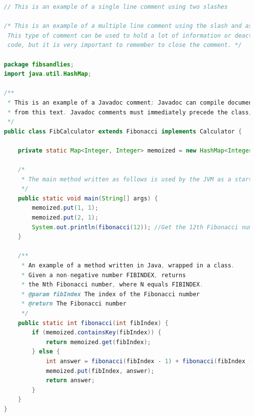 \begin{lstlisting}[language=Java, caption=\selectlanguage{greek}Παράδειγμα κώδικα σε \selectlanguage{english}Java]
// This is an example of a single line comment using two slashes

/* This is an example of a multiple line comment using the slash and asterisk.
 This type of comment can be used to hold a lot of information or deactivate
 code, but it is very important to remember to close the comment. */

package fibsandlies;
import java.util.HashMap;

/**
 * This is an example of a Javadoc comment; Javadoc can compile documentation
 * from this text. Javadoc comments must immediately precede the class, method, or field being documented.
 */
public class FibCalculator extends Fibonacci implements Calculator {

    private static Map<Integer, Integer> memoized = new HashMap<Integer, Integer>();

    /*
     * The main method written as follows is used by the JVM as a starting point for the program.
     */
    public static void main(String[] args) {
        memoized.put(1, 1);
        memoized.put(2, 1);
        System.out.println(fibonacci(12)); //Get the 12th Fibonacci number and print to console
    }

    /**
     * An example of a method written in Java, wrapped in a class.
     * Given a non-negative number FIBINDEX, returns
     * the Nth Fibonacci number, where N equals FIBINDEX.
     * @param fibIndex The index of the Fibonacci number
     * @return The Fibonacci number
     */
    public static int fibonacci(int fibIndex) {
        if (memoized.containsKey(fibIndex)) {
            return memoized.get(fibIndex);
        } else {
            int answer = fibonacci(fibIndex - 1) + fibonacci(fibIndex - 2);
            memoized.put(fibIndex, answer);
            return answer;
        }
    }
}
\end{lstlisting}



